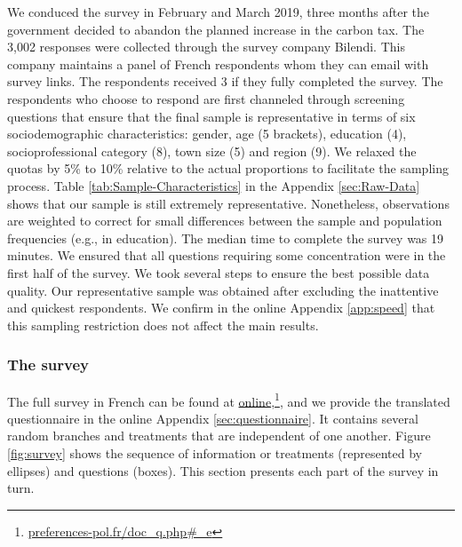 \documentclass[12pt]{article} %
\begin{document}
We conduced the survey in February and March 2019, three months after the government decided to abandon the planned increase in the carbon tax. The 3,002 responses were collected through the survey company Bilendi. This company maintains a panel of French respondents whom they can email with survey links. The respondents received 3\euros{} if they fully completed the survey. The respondents who choose to respond are first channeled through screening questions that ensure that the final sample is representative in terms of six sociodemographic characteristics: gender, age (5 brackets), education (4), socioprofessional category (8), town size (5) and region (9). We relaxed the quotas by 5\% to 10\% relative to the actual proportions to facilitate the sampling process. Table \ref{tab:Sample-Characteristics} in the Appendix \ref{sec:Raw-Data} shows that our sample is still extremely representative. Nonetheless, observations are weighted to correct for small differences between the sample and population frequencies (e.g., in education). The median time to complete the survey was 19 minutes. We ensured that all questions requiring some concentration were in the first half of the survey. We took several steps to ensure the best possible data quality. Our representative sample was obtained after excluding the inattentive and quickest respondents. We confirm in the online Appendix \ref{app:speed} that this sampling restriction does not affect the main results. %

\subsubsection{The survey \label{subsubsec:the-survey}}




The full survey in French can be found at \href{http://preferences-pol.fr/doc_q.php#_e}{online},\footnote{\href{http:\/\/preferences-pol.fr\/doc\_q.php\#\_e}{preferences-pol.fr/doc\_q.php\#\_e}}, and we provide the translated questionnaire in the online Appendix \ref{sec:questionnaire}. It contains several random branches and treatments that are independent of one another. Figure \ref{fig:survey} shows the sequence of information or treatments (represented by ellipses) and questions (boxes). This section presents each part of the survey in turn. %
\end{document}
